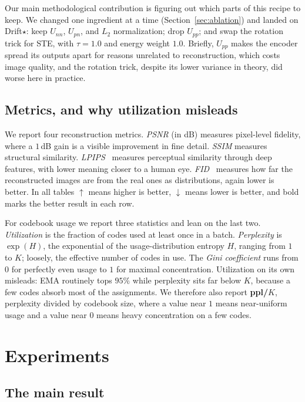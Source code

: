 \documentclass[10pt,twocolumn,letterpaper]{article}
\begin{document}
Our main methodological contribution is figuring out which parts of this recipe to
keep. We changed one ingredient at a time (Section~\ref{sec:ablation}) and landed on
Drift$\star$: keep $U_{nn}$, $U_{pn}$, and $L_2$ normalization; drop $U_{pp}$; and
swap the rotation trick for STE, with $\tau{=}1.0$ and energy weight $1.0$. Briefly,
$U_{pp}$ makes the encoder spread its outputs apart for reasons unrelated to
reconstruction, which costs image quality, and the rotation trick, despite its lower
variance in theory, did worse here in practice.

\subsection{Metrics, and why utilization misleads}

We report four reconstruction metrics. \emph{PSNR} (in dB) measures pixel-level
fidelity, where a $1$\,dB gain is a visible improvement in fine detail. \emph{SSIM}
measures structural similarity. \emph{LPIPS}~\cite{lpips} measures perceptual
similarity through deep features, with lower meaning closer to a human eye.
\emph{FID}~\cite{fid} measures how far the reconstructed images are from the real ones
as distributions, again lower is better. In all tables $\uparrow$ means higher is
better, $\downarrow$ means lower is better, and bold marks the better result in each
row.

For codebook usage we report three statistics and lean on the last two.
\emph{Utilization} is the fraction of codes used at least once in a batch.
\emph{Perplexity} is $\exp(H)$, the exponential of the usage-distribution entropy $H$,
ranging from $1$ to $K$; loosely, the effective number of codes in use. The \emph{Gini
coefficient} runs from $0$ for perfectly even usage to $1$ for maximal concentration.
Utilization on its own misleads: EMA routinely tops $95\%$ while perplexity sits far
below $K$, because a few codes absorb most of the assignments. We therefore also report
\textbf{ppl/$K$}, perplexity divided by codebook size, where a value near $1$ means
near-uniform usage and a value near $0$ means heavy concentration on a few codes.

\section{Experiments}

\subsection{The main result}
\label{sec:main}
\end{document}

